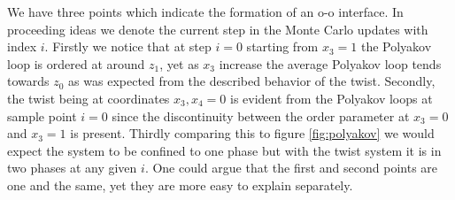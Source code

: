 \documentclass[english,twoside,openright]{UH_TCM_MSc}
\begin{document}
We have three points which indicate the formation of an o-o interface. In proceeding ideas we denote the current step in the Monte Carlo updates with index $i$. Firstly we notice that at step $i=0$ starting from $x_3=1$ the Polyakov loop is ordered  at around $z_1$, yet as $x_3$ increase the average Polyakov loop tends towards $z_0$ as was expected from the described behavior of the twist.  Secondly, the twist being at coordinates $x_3,x_4 =0$ is evident from the Polyakov loops at sample point $i=0$ since the discontinuity between the order parameter at $x_3 = 0$ and $x_3=1$ is present. Thirdly comparing this to figure \ref{fig:polyakov} we would expect the system to be confined to one phase but with the twist system it is in two phases at any given $i$. One could argue that the first and second points are one and the same, yet they are more easy to explain separately. 
\end{document}
